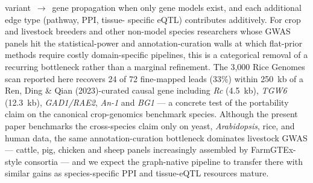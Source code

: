 variant~$\rightarrow$~gene propagation when only gene models
exist, and each additional edge type (pathway, PPI, tissue-
specific eQTL) contributes additively. For crop and livestock breeders and other non-model species
researchers whose GWAS panels hit the
statistical-power and annotation-curation walls at which
flat-prior methods require costly domain-specific pipelines,
this is a categorical removal of a recurring bottleneck rather
than a marginal refinement. The 3{,}000 Rice Genomes scan
reported here recovers 24 of 72 fine-mapped leads (33\%) within
250~kb of a Ren, Ding \& Qian (2023)\cite{ren2023rice}-curated
causal gene including \emph{Rc} (4.5~kb), \emph{TGW6} (12.3~kb),
\emph{GAD1/RAE2}, \emph{An-1} and \emph{BG1} --- a concrete
test of the portability claim on the canonical crop-genomics
benchmark species. Although the present paper benchmarks the
cross-species claim only on yeast, \emph{Arabidopsis}, rice, and
human data, the same annotation-curation bottleneck dominates
livestock GWAS --- cattle, pig, chicken and sheep panels
increasingly assembled by FarmGTEx-style consortia --- and we
expect the graph-native pipeline to transfer there with similar
gains as species-specific PPI and tissue-eQTL resources mature.

